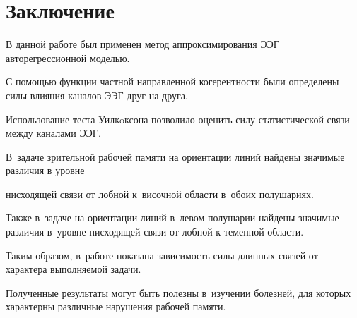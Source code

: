 \section{Заключение}





В данной работе был применен метод аппроксимирования ЭЭГ авторегрессионной моделью.


С помощью функции частной направленной когерентности были определены силы влияния каналов ЭЭГ друг на друга.


Использование теста Уилкoксона позволило оценить силу статистической связи между каналами ЭЭГ.


В~задаче зрительной рабочей памяти на ориентации линий найдены значимые различия в уровне 


нисходящей связи от лобной к~височной об\-ласти в~обоих полушариях.


Также в~задаче на ориентации линий в~левом полушарии найдены значимые различия в~уровне нисходящей связи от лобной к теменной области.


Таким образом, в~работе показана зависимость силы длинных связей от характера выполняемой задачи.


Полученные результаты могут быть полезны в~изучении болезней, для которых характерны различные нарушения рабочей памяти.











